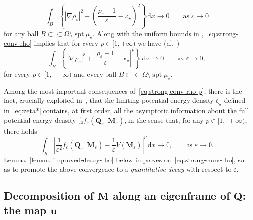 \documentclass[a4paper, 11pt, twoside, leqno]{article}
\theoremstyle{definition}              %
\theoremstyle{remark}                  %
\DeclareMathOperator{\spt}{spt}                                     %
\newcommand{\abs}[1]{\left| #1 \right|}                             %
\newcommand{\csubset}{\subset\!\subset}                             %
\renewcommand{\d}{\mathrm{d}}
\newcommand{\Q}{\mathbf{Q}}
\newcommand{\M}{\mathbf{M}}
\renewcommand{\u}{\mathbf{u}}
\newcommand{\eps}{\varepsilon}
\begin{document}
\begin{equation}\label{eq:strong-conv-rho}
    \int_B \left\{\abs{\nabla \rho_\eps}^2 + \left(\frac{\rho_\eps - 1}{\eps} - \kappa_\star\right)^2\right\}\,{\d}x \to 0 \qquad \mbox{as } \eps \to 0
\end{equation}
for any ball $B \csubset \Omega \setminus \spt \mu_\star$. 
Along with the uniform bounds in \cite[Proposition~2.6]{CDS1},~\eqref{eq:strong-conv-rho} 
implies that for every $p \in [1, +\infty)$ we have (cf.~\cite[Remark~3.6]{CDS1})
\begin{equation}\label{eq:strong-conv-rho-p}
    \int_B \left\{\abs{\nabla \rho_\eps}^p + \abs{\frac{\rho_\eps - 1}{\eps} - \kappa_\star}^p\right\}\,{\d}x \to 0 \qquad \mbox{as } \eps \to 0, 
\end{equation}
for every $p \in [1,\,+\infty)$ and every ball $B \csubset \Omega \setminus \spt \mu_\star$. 

Among the most important consequences of~\eqref{eq:strong-conv-rho-p}, there is 
the fact, crucially exploited in~\cite{CDS2}, that the limiting potential 
energy density $\zeta_\star$ defined in~\eqref{eq:zeta*}   
contains, at first order, all the asymptotic information about the full potential 
energy density $\frac{1}{\eps^2} f_\eps(\Q_\eps,\,\M_\eps)$, in the sense 
that, for any $p \in [1,\,+\infty)$, there holds
\begin{equation}\label{eq:f-V-p}
	\int_K \abs{\frac{1}{\eps^2}f_\eps(\Q_\eps,\,\M_\eps) - \frac{1}{\eps}V(\M_\eps)}^p \,{\d}x \to 0, \qquad \mbox{as } \eps \to 0.
\end{equation}
Lemma~\ref{lemma:improved-decay-rho} below improves on~\eqref{eq:strong-conv-rho},   
so as to promote the above convergence to 
a \emph{quantitative decay} with respect to $\eps$.

\subsection{Decomposition of $\M$ along an eigenframe of $\Q$: the map $\u$}
\end{document}
